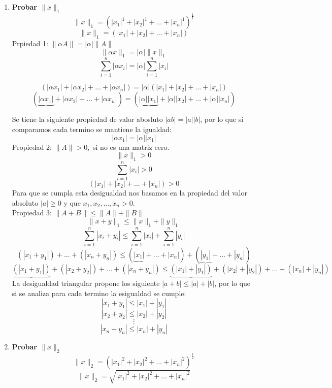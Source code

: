 \documentclass[12pt]{article}
\begin{document}
  \begin{enumerate}
      \item \textbf{Probar $\|x\|_{1}$}
          \[\|x\|_{1} = (|x_{1}|^{1} + |x_{2}|^{1} + ... + |x_{n}|^{1})^{\frac{1}{1}}\]
          \[\|x\|_{1} = (|x_{1}| + |x_{2}| + ... + |x_{n}|)\]
          Prpiedad 1: $\|\alpha A\| = |\alpha| \|A\|$
          \[ \|\alpha x\|_{1} = |\alpha| \|x\|_{1} \]
          \[ \sum_{i = 1}^{n}|\alpha x_{i}| = |\alpha|\sum_{i = 1}^{n}|x_{i}|\]
          
          \[(|\alpha x_{1}| + |\alpha x_{2}| + ... + |\alpha x_{n}|)  =|\alpha| (|x_{1}| + |x_{2}| + ... + |x_{n}|)\]
          \[(\underbrace{|\alpha x_{1}|} + |\alpha x_{2}| + ... + |\alpha x_{n}|) = ( \underbrace{ |\alpha| |x_{1}|} + |\alpha| |x_{2}| + ... + |\alpha| |x_{n}|)\] 
        
          Se tiene la siguiente propiedad de valor abosluto $|ab|=|a||b|$, por lo que si comparamos cada termino se mantiene la igualdad:
            \[|\alpha x_{1}| =|\alpha| |x_{1}| \]
          Propiedad 2: $\|A\| > 0 ,$ si no es una matriz cero.
          \[\|x\|_{1} > 0\]
          \[ \sum_{i = 1}^{n}|x_{i}| > 0\]
          \[(| x_{1}| + | x_{2}| + ... + | x_{n}|)  > 0\]
          Para que se cumpla esta desigualdad nos basamos en la propiedad del valor absoluto $|a| \geq 0 $ y que $x_{1}, x_{2}, ... , x_{n} > 0$.
          \\Propiedad 3: $\|A + B\| \leq \|A\| +  \|B\|$
          \[ \|x + y\|_{1} \leq \|x\|_{1} +  \|y\|_{1} \]
          \[ \sum_{i = 1}^{n}|x_{i} + y_{i}| \leq \sum_{i = 1}^{n}|x_{i}| +  \sum_{i = 1}^{n}|y_{i}|\]
          \[ (|x_{1} + y_{1}|) + ... + (|x_{n} + y_{n}|) \leq (\underbrace{|x_{1}|} + ... + |x_{n}|) + ( \underbrace{|y_{1}|} + ... + |y_{n}|) \]
          \[ \underbrace{ (|x_{1} + y_{1}|)} + (|x_{2} + y_{2}|) + ... + (|x_{n} + y_{n}|) \leq \underbrace{(|x_{1}| + |y_{1}|)} + (|x_{2}| + |y_{2}|) + ... + (|x_{n}| + |y_{n}|) \]
          La desigualdad triangular propone los siguiente $|a+b| \leq |a|+|b|$, por lo que si se analiza para cada termino la esigualdad se cumple:
          \[ |x_{1} + y_{1}| \leq |x_{1}| + |y_{1}| \]
          \[ |x_{2} + y_{2}| \leq |x_{2}| + |y_{2}| \]
          \[ \vdots \]
          \[ |x_{n} + y_{n}| \leq |x_{n}| + |y_{n}| \]
          
      \item \textbf{Probar $\|x\|_{2}$}
            \[\|x\|_{2} = (|x_{1}|^{2} + |x_{2}|^{2} + ... + |x_{n}|^{2})^{\frac{1}{2}}\]
          \[\|x\|_{2} = \sqrt{|x_{1}|^{2} + |x_{2}|^{2} + ... + |x_{n}|^{2}}\]
          

\end{enumerate}
\end{document}
